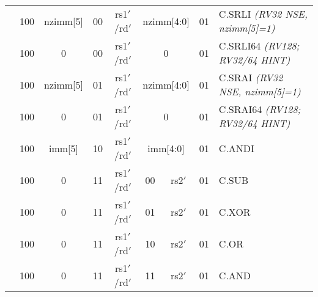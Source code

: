 \begin{table}[h]
\begin{small}
\begin{center}
\begin{tabular}{p{0in}p{0.05in}p{0.05in}p{0.05in}p{0.05in}p{0.05in}p{0.05in}p{0.05in}p{0.05in}p{0.05in}p{0.05in}p{0.05in}p{0.05in}p{0.05in}p{0.05in}p{0.05in}p{0.05in}l}
&
\multicolumn{3}{|c|}{100} &
\multicolumn{1}{c|}{nzimm[5]} &
\multicolumn{2}{c|}{00} &
\multicolumn{3}{c|}{rs1$'$/rd$'$} &
\multicolumn{5}{c|}{nzimm[4:0]} &
\multicolumn{2}{c|}{01} & C.SRLI {\em \tiny (RV32 NSE, nzimm[5]=1)} \\
\cline{2-17}

&
\multicolumn{3}{|c|}{100} &
\multicolumn{1}{c|}{0} &
\multicolumn{2}{c|}{00} &
\multicolumn{3}{c|}{rs1$'$/rd$'$} &
\multicolumn{5}{c|}{0} &
\multicolumn{2}{c|}{01} & C.SRLI64 {\em \tiny (RV128; RV32/64 HINT)} \\
\cline{2-17}

&
\multicolumn{3}{|c|}{100} &
\multicolumn{1}{c|}{nzimm[5]} &
\multicolumn{2}{c|}{01} &
\multicolumn{3}{c|}{rs1$'$/rd$'$} &
\multicolumn{5}{c|}{nzimm[4:0]} &
\multicolumn{2}{c|}{01} & C.SRAI {\em \tiny (RV32 NSE, nzimm[5]=1)} \\
\cline{2-17}

&
\multicolumn{3}{|c|}{100} &
\multicolumn{1}{c|}{0} &
\multicolumn{2}{c|}{01} &
\multicolumn{3}{c|}{rs1$'$/rd$'$} &
\multicolumn{5}{c|}{0} &
\multicolumn{2}{c|}{01} & C.SRAI64 {\em \tiny (RV128; RV32/64 HINT)} \\
\cline{2-17}

&
\multicolumn{3}{|c|}{100} &
\multicolumn{1}{c|}{imm[5]} &
\multicolumn{2}{c|}{10} &
\multicolumn{3}{c|}{rs1$'$/rd$'$} &
\multicolumn{5}{c|}{imm[4:0]} &
\multicolumn{2}{c|}{01} & C.ANDI \\
\cline{2-17}

&
\multicolumn{3}{|c|}{100} &
\multicolumn{1}{c|}{0} &
\multicolumn{2}{c|}{11} &
\multicolumn{3}{c|}{rs1$'$/rd$'$} &
\multicolumn{2}{c|}{00} &
\multicolumn{3}{c|}{rs2$'$} &
\multicolumn{2}{c|}{01} & C.SUB \\
\cline{2-17}

&
\multicolumn{3}{|c|}{100} &
\multicolumn{1}{c|}{0} &
\multicolumn{2}{c|}{11} &
\multicolumn{3}{c|}{rs1$'$/rd$'$} &
\multicolumn{2}{c|}{01} &
\multicolumn{3}{c|}{rs2$'$} &
\multicolumn{2}{c|}{01} & C.XOR \\
\cline{2-17}

&
\multicolumn{3}{|c|}{100} &
\multicolumn{1}{c|}{0} &
\multicolumn{2}{c|}{11} &
\multicolumn{3}{c|}{rs1$'$/rd$'$} &
\multicolumn{2}{c|}{10} &
\multicolumn{3}{c|}{rs2$'$} &
\multicolumn{2}{c|}{01} & C.OR \\
\cline{2-17}

&
\multicolumn{3}{|c|}{100} &
\multicolumn{1}{c|}{0} &
\multicolumn{2}{c|}{11} &
\multicolumn{3}{c|}{rs1$'$/rd$'$} &
\multicolumn{2}{c|}{11} &
\multicolumn{3}{c|}{rs2$'$} &
\multicolumn{2}{c|}{01} & C.AND \\
\cline{2-17}


\end{tabular}
\end{center}
\end{small}
\end{table}
